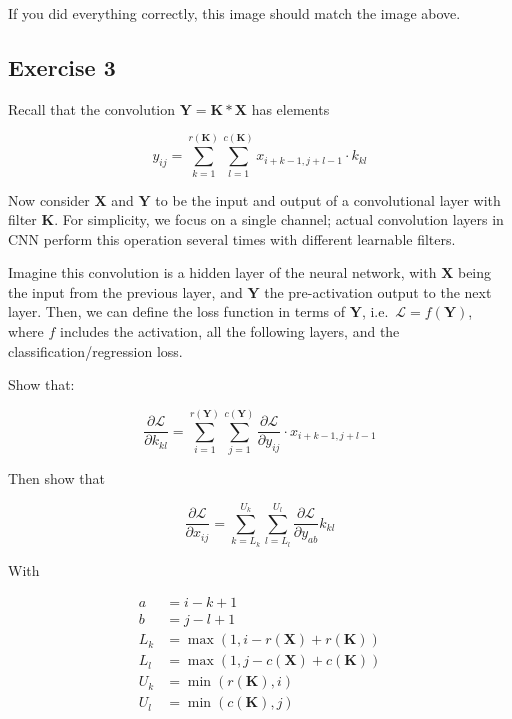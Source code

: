 \documentclass[
  a4paper,
]{article}
\begin{document}
If you did everything correctly, this image should match the image
above.

\hypertarget{exercise-3}{%
\subsection{Exercise 3}\label{exercise-3}}

Recall that the convolution \(\textbf{Y}=\textbf{K}*\textbf{X}\) has
elements

\begin{equation}
y_{ij}=\sum_{k=1}^{r(\textbf{K})}\sum_{l=1}^{c(\textbf{K})}x_{i+k-1,j+l-1}\cdot k_{kl}
\end{equation}

Now consider \(\textbf{X}\) and \(\textbf{Y}\) to be the input and
output of a convolutional layer with filter \(\textbf{K}\). For
simplicity, we focus on a single channel; actual convolution layers in
CNN perform this operation several times with different learnable
filters.

Imagine this convolution is a hidden layer of the neural network, with
\(\textbf{X}\) being the input from the previous layer, and
\(\textbf{Y}\) the pre-activation output to the next layer. Then, we can
define the loss function in terms of \(\textbf{Y}\),
i.e.~\(\mathcal{L}=f(\textbf{Y})\), where \(f\) includes the activation,
all the following layers, and the classification/regression loss.

Show that:

\begin{equation}
\frac{\partial\mathcal{L}}{\partial k_{kl}}=\sum_{i=1}^{r(\textbf{Y})}\sum_{j=1}^{c(\textbf{Y})}\frac{\partial\mathcal{L}}{\partial y_{ij}}\cdot x_{i+k-1,j+l-1}
\end{equation}

Then show that

\begin{equation}
\frac{\partial\mathcal{L}}{\partial x_{ij}}=\sum_{k=L_k}^{U_k}\sum_{l=L_l}^{U_l}\frac{\partial\mathcal{L}}{\partial y_{ab}}k_{kl}
\end{equation}

With

\begin{align}
a &= i-k+1 \\
b &= j-l+1 \\
L_k &= \max(1, i - r(\textbf{X}) + r(\textbf{K})) \\
L_l &= \max(1, j - c(\textbf{X}) + c(\textbf{K})) \\
U_k &= \min(r(\textbf{K}), i) \\
U_l &= \min(c(\textbf{K}), j)
\end{align}
\end{document}
